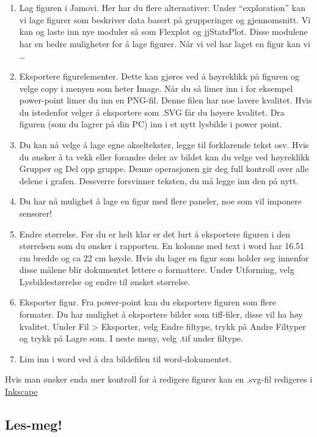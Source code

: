 \documentclass[
  letterpaper,
  DIV=11,
  numbers=noendperiod,
  oneside]{scrreprt}
\providecommand{\tightlist}{%
  \setlength{\itemsep}{0pt}\setlength{\parskip}{0pt}}\usepackage{longtable,booktabs,array}
\begin{document}
\begin{enumerate}
\def\labelenumi{\arabic{enumi}.}
\tightlist
\item
  Lag figuren i Jamovi. Her har du flere alternativer: Under
  ``exploration'' kan vi lage figurer som beskriver data basert på
  grupperinger og gjennomsnitt. Vi kan og laste inn nye moduler så som
  Flexplot og jjStatsPlot. Disse modulene har en bedre muligheter for å
  lage figurer. Når vi vel har laget en figur kan vi \ldots{}
\item
  Eksportere figurelementer. Dette kan gjøres ved å høyreklikk på
  figuren og velge copy i menyen som heter Image. Når du så limer inn i
  for eksempel power-point limer du inn en PNG-fil. Denne filen har noe
  lavere kvalitet. Hvis du istedenfor velger å eksportere som .SVG får
  du høyere kvalitet. Dra figuren (som du lagrer på din PC) inn i et
  nytt lysbilde i power point.
\item
  Du kan nå velge å lage egne akseltekster, legge til forklarende tekst
  osv. Hvis du ønsker å ta vekk eller forandre deler av bildet kan du
  velge ved høyreklikk Grupper og Del opp gruppe. Denne operasjonen gir
  deg full kontroll over alle delene i grafen. Dessverre forsvinner
  teksten, du må legge inn den på nytt.
\item
  Du har nå mulighet å lage en figur med flere paneler, noe som vil
  imponere sensorer!
\item
  Endre størrelse. Før du er helt klar er det lurt å eksportere figuren
  i den størrelsen som du ønsker i rapporten. En kolonne med text i word
  har 16.51 cm bredde og ca 22 cm høyde. Hvis du lager en figur som
  holder seg innenfor disse målene blir dokumentet lettere o formattere.
  Under Utforming, velg Lysbildestørrelse og endre til ønsket størrelse.
\item
  Eksporter figur. Fra power-point kan du eksportere figuren som flere
  formater. Du har mulighet å eksportere bilder som tiff-filer, disse
  vil ha høy kvalitet. Under Fil \textgreater{} Eksporter, velg Endre
  filtype, trykk på Andre Filtyper og trykk på Lagre som. I neste meny,
  velg .tif under filtype.
\item
  Lim inn i word ved å dra bildefilen til word-dokumentet.
\end{enumerate}

Hvis man ønsker enda mer kontroll for å redigere figurer kan en .svg-fil
redigeres i \href{https://inkscape.org/}{Inkscape}

\hypertarget{les-meg}{%
\subsection{Les-meg!}\label{les-meg}}
\end{document}
